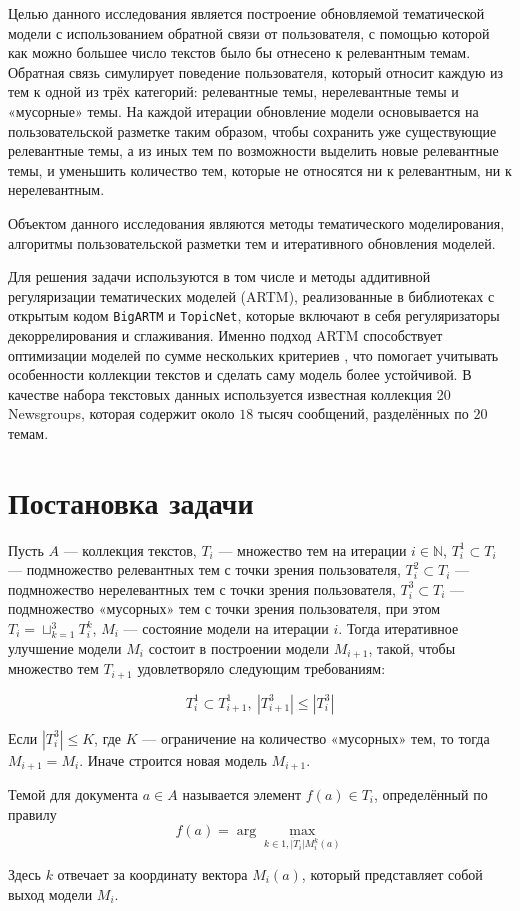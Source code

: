 \documentclass{article}
\begin{document}
Целью данного исследования является построение обновляемой тематической модели с использованием обратной связи от пользователя, с помощью которой как можно большее число текстов было бы отнесено к релевантным темам. Обратная связь симулирует поведение пользователя, который относит каждую из тем к одной из трёх категорий: релевантные темы, нерелевантные темы и «мусорные» темы. На каждой итерации обновление модели основывается на пользовательской разметке таким образом, чтобы сохранить уже существующие релевантные темы, а из иных тем по возможности выделить новые релевантные темы, и уменьшить количество тем, которые не относятся ни к релевантным, ни к нерелевантным.

Объектом данного исследования являются методы тематического моделирования, алгоритмы пользовательской разметки тем и итеративного обновления моделей.

Для решения задачи используются в том числе и методы аддитивной регуляризации тематических моделей (ARTM), реализованные в библиотеках с открытым кодом \texttt{BigARTM} и \texttt{TopicNet}, которые включают в себя регуляризаторы декоррелирования и сглаживания. Именно подход ARTM способствует оптимизации моделей по сумме нескольких критериев \citep{artm}, что помогает учитывать особенности коллекции текстов и сделать саму модель более устойчивой. В качестве набора текстовых данных используется известная коллекция 20 Newsgroups, которая содержит около $18$ тысяч сообщений, разделённых по $20$ темам.

\section{Постановка задачи}

Пусть $A$ — коллекция текстов, $T_i$ — множество тем на итерации $i \in \mathbb{N}$, $T_i^1 \subset T_i$ — подмножество релевантных тем с точки зрения пользователя, $T_i^2 \subset T_i$ — подмножество нерелевантных тем с точки зрения пользователя, $T_i^3 \subset T_i$ — подмножество «мусорных» тем с точки зрения пользователя, при этом $T_i = \sqcup_{k = 1}^3 T_i^k$, $M_i$ — состояние модели на итерации $i$. Тогда итеративное улучшение модели $M_i$ состоит в построении модели $M_{i + 1}$, такой, чтобы множество тем $T_{i + 1}$ удовлетворяло следующим требованиям:

$$T_i^1 \subset T_{i + 1}^1, \ \left| T_{i + 1}^3 \right| \leq \left| T_i^3 \right|$$

Если $\left| T_i^3 \right| \leq K$, где $K$ — ограничение на количество «мусорных» тем, то тогда $M_{i + 1} = M_i$. Иначе строится новая модель $M_{i + 1}$.

Темой для документа $a \in A$ называется элемент $f(a) \in T_i$, определённый по правилу $$f(a) = \arg \max \limits_{k \in  \overline{1, |T_i|} M_i^k (a)}$$

Здесь $k$ отвечает за координату вектора $M_i (a)$, который представляет собой выход модели $M_i$.



\end{document}
